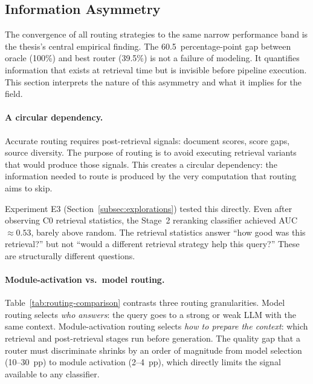 \subsection{Information Asymmetry}
\label{subsec:ceiling-interpretation}

The convergence of all routing strategies to the same narrow performance
band is the thesis's central empirical finding.  The 60.5~percentage-point
gap between oracle (100\%) and best router (39.5\%) is not a failure of
modeling.  It quantifies information that exists at retrieval time but is
invisible before pipeline execution.  This section interprets the nature
of this asymmetry and what it implies for the field.

\paragraph{A circular dependency.}
Accurate routing requires post-retrieval signals: document scores,
score gaps, source diversity.  The purpose of routing is to avoid
executing retrieval variants that would produce those signals.  This
creates a circular dependency: the information needed to route is
produced by the very computation that routing aims to skip.

Experiment E3 (Section~\ref{subsec:explorations})
tested this directly.  Even after observing C0 retrieval statistics,
the Stage~2 reranking classifier achieved AUC~$\approx 0.53$, barely
above random.  The retrieval statistics answer ``how good was this
retrieval?'' but not ``would a different retrieval strategy help this
query?''  These are structurally different questions.

\paragraph{Module-activation vs.\ model routing.}
Table~\ref{tab:routing-comparison} contrasts three routing granularities.
Model routing selects \emph{who answers}: the query goes to a strong or
weak LLM with the same context.  Module-activation routing selects
\emph{how to prepare the context}: which retrieval and post-retrieval
stages run before generation.  The quality gap that a router must
discriminate shrinks by an order of magnitude from model selection
(10--30~pp) to module activation (2--4~pp), which directly limits the
signal available to any classifier.

